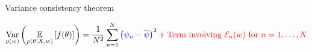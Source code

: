 

    



\begin{frame}[t]{Variance consistency theorem}

%
\begin{align*}
    \underset{p(w)}{\mathrm{Var}}\left(\underset{p(\theta \vert X, w)}{\mathbb{E}}\left[f(\theta)\right]\right)
    = 
    \frac{1}{N^2} \sum_{n=1}^N \left(
        \textcolor{blue}{\psi_n - \overline{\psi}}
    \right)^2 +
    \textcolor{red}{\textrm{Term involving }
        \textcolor{red}{\mathcal{E}_n}(w)
        \textrm{ for }n =1,\dots,N
    }
\end{align*}
%
\def\thetatrue{\theta_{\infty}}
\def\thetahat{\hat\theta}


\def\normdist{\mathcal{N}}

\def\gcovtrue{V^g}
\def\gcovij{V^{\mathrm{IJ}}}


\end{frame}
